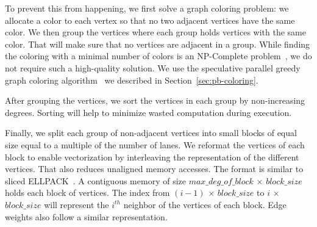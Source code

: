 \documentclass[default,iicol]{sn-jnl}%
\theoremstyle{thmstyleone}%
\theoremstyle{thmstyletwo}%
\theoremstyle{thmstylethree}%
\begin{document}
To prevent this from happening, we first solve a graph coloring problem: we allocate a color to each vertex so 
that no two adjacent vertices have the same color. We then group the vertices where each group holds vertices 
with the same color. That will make sure that no vertices are adjacent in a group. While finding the coloring 
with a minimal number of colors is an NP-Complete problem~\cite{GareyJohnson79}, we do not require such a
high-quality solution. We use the speculative parallel greedy graph coloring
algorithm~\cite{Catalyurek12-ParCo} we described in Section~\ref{sec:pb-coloring}. 

After grouping the vertices, we sort the vertices in each group by non-increasing degrees. 
Sorting will help to minimize wasted computation during execution.

Finally, we split each group of non-adjacent vertices into small blocks of equal size equal to a multiple of 
the number of lanes. We reformat the vertices of each block to enable vectorization by interleaving the 
representation of the different vertices. That also reduces unaligned memory accesses. The format is similar to 
sliced ELLPACK~\cite{monakov2010automatically}. A contiguous memory of size $max\_deg\_of\_block$ $\times$ $block\_size$ 
holds each block of vertices. The index from $(i-1)$ $\times$ $block\_size$ to $i$ $\times$ $block\_size$ will 
represent the $i^{th}$ neighbor of the vertices of each block. Edge weights also follow a similar representation.
\end{document}
